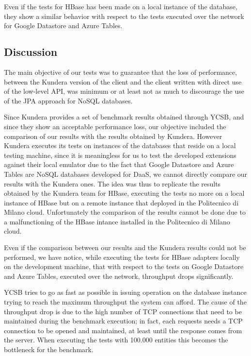 \noindent Even if the tests for HBase has been made on a local instance of the database, they show a similar behavior with respect to the tests executed over the network for Google Datastore and Azure Tables.

\subsection{Discussion}
The main objective of our tests was to guarantee that the loss of performance, between the Kundera version of the client and the client written with direct use of the low-level API, was minimum or at least not as much to discourage the use of the JPA approach for NoSQL databases.

\noindent Since Kundera provides a set of benchmark results obtained through YCSB, and since they show an acceptable performance loss, our objective included the comparison of our results with the results obtained by Kundera. However Kundera executes its tests on instances of the databases that reside on a local testing machine, since it is meaningless for us to test the developed extensions against their local emulator due to the fact that Google Datastore and Azure Tables are NoSQL databases developed for DaaS, we cannot directly compare our results with the Kundera ones. The idea was thus to replicate the results obtained by the Kundera team for HBase, executing the tests no more on a local instance of HBase but on a remote instance that deployed in the Politecnico di Milano cloud. Unfortunately the comparison of the results cannot be done due to a malfunctioning of the HBase intance installed in the Politecnico di Milano cloud.

\newparagraph Even if the comparison between our results and the Kundera results could not be performed, we have notice, while executing the tests for HBase adapters locally on the development machine, that with respect to the tests on Google Datastore and Azure Tables, executed over the network, throughput drops significantly.

\noindent YCSB tries to go as fast as possible in issuing operation on the database instance trying to reach the maximum throughput the system can afford. The cause of the throughput drop is due to the high number of TCP connections that need to be maintained during the benchmark execution; in fact, each requests needs a TCP connection to be opened and maintained, at least until the response comes from the server. When executing the tests with 100.000 entities this becomes the bottleneck for the benchmark.


